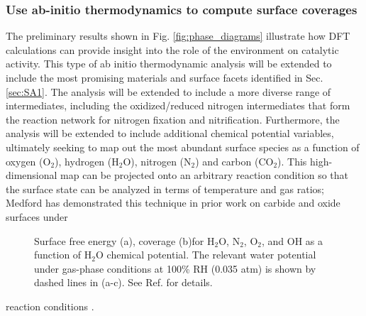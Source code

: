 \subsubsection{Use ab-initio thermodynamics to compute surface coverages}
\vspace{1mm}
The preliminary results shown in Fig. \ref{fig:phase_diagrams} illustrate how DFT calculations can provide insight into the role of the environment on catalytic activity. This type of ab initio thermodynamic analysis will be extended to include the most promising materials and surface facets identified in Sec. \ref{sec:SA1}. The analysis will be extended to include a more diverse range of intermediates, including the oxidized/reduced nitrogen intermediates that form the reaction network for nitrogen fixation and nitrification. Furthermore, the analysis will be extended to include additional chemical potential variables, ultimately seeking to map out the most abundant surface species as a function of oxygen (O$_2$), hydrogen (H$_2$O), nitrogen (N$_2$) and carbon (CO$_2$). This high-dimensional map can be projected onto an arbitrary reaction condition so that the surface state can be analyzed in terms of temperature and gas ratios; Medford has demonstrated this technique in prior work on carbide and oxide surfaces under\begin{figure}
\centering
\vspace{-1mm}
\caption{Surface free energy (a), coverage (b)for H$_2$O, N$_2$, O$_2$, and OH as a function of H$_2$O chemical potential. The relevant water potential under gas-phase conditions at 100\% RH (0.035 atm) is shown by dashed lines in (a-c). See Ref.  for details.}
\label{fig:theory}
\vspace{-2mm}
\end{figure}  reaction conditions \cite{Medford_2012b, Medford_2014b}.

\vspace{1mm}
